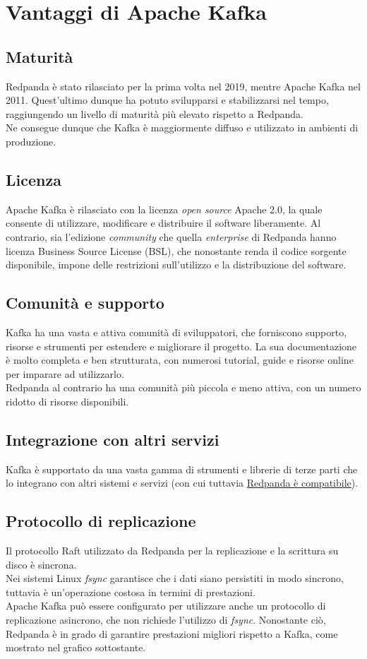 \section{Vantaggi di Apache Kafka}
\subsection{Maturità}
Redpanda è stato rilasciato per la prima volta nel 2019, mentre Apache Kafka nel 2011.
Quest'ultimo dunque ha potuto svilupparsi e stabilizzarsi nel tempo, raggiungendo
un livello di maturità più elevato rispetto a Redpanda.\\
Ne consegue dunque che Kafka è maggiormente diffuso e utilizzato in ambienti di
produzione.

\subsection{Licenza}
Apache Kafka è rilasciato con la licenza \textit{open source} Apache 2.0, la quale consente di utilizzare, modificare e distribuire il software liberamente.
Al contrario, sia l'edizione \textit{community} che quella \textit{enterprise} di Redpanda hanno licenza Business Source License (BSL), che
nonostante renda il codice sorgente disponibile, impone delle restrizioni sull'utilizzo e la distribuzione del software.


\subsection{Comunità e supporto}
Kafka ha una vasta e attiva comunità di sviluppatori, che forniscono supporto, risorse e strumenti per estendere e migliorare il progetto.
La sua documentazione è molto completa e ben strutturata, con numerosi tutorial, guide e risorse online per imparare ad utilizzarlo.\\
Redpanda al contrario ha una comunità più piccola e meno attiva, con un numero ridotto di risorse disponibili.

\subsection{Integrazione con altri servizi}
Kafka è supportato da una vasta gamma di strumenti e librerie di terze parti che lo integrano con altri sistemi e servizi
(con cui tuttavia \href{https://docs.redpanda.com/current/develop/kafka-clients/}{Redpanda è compatibile}).

\subsection{Protocollo di replicazione}
Il protocollo Raft utilizzato da Redpanda per la replicazione e la scrittura su disco è sincrona. \\
Nei sistemi Linux \textit{fsync} garantisce che i dati siano persistiti in modo sincrono, tuttavia
è un'operazione costosa in termini di prestazioni.\\
Apache Kafka può essere configurato per utilizzare anche un protocollo di replicazione asincrono, che non richiede l'utilizzo di \textit{fsync}.
Nonostante ciò, Redpanda è in grado di garantire prestazioni migliori rispetto a Kafka, come mostrato nel grafico sottostante.

